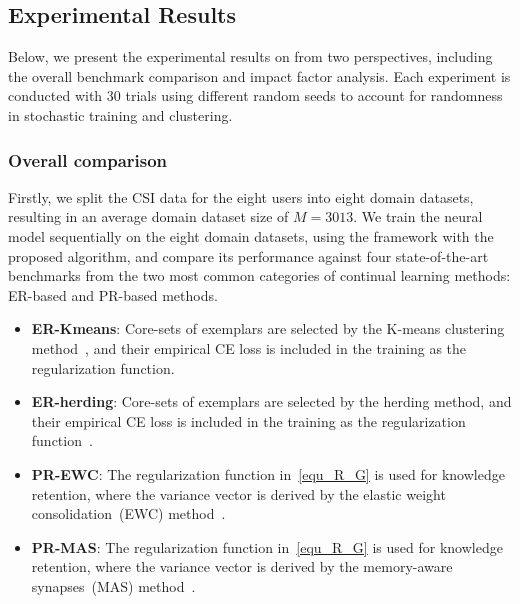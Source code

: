 \subsection{Experimental Results}\label{s2ec_exp_res}
Below, we present the experimental results on \name from two perspectives, including the overall benchmark comparison and impact factor analysis.
Each experiment is conducted with 30 trials using different random seeds to account for randomness in stochastic training and clustering.

\subsubsection{Overall comparison}\label{s3ec_overall_compare}

Firstly, we split the CSI data for the eight users into eight domain datasets, resulting in an average domain dataset size of $M=3013$.
We train the neural model sequentially on the eight domain datasets, using the \name framework with the proposed algorithm, and compare its performance against four state-of-the-art benchmarks from the two most common categories of continual learning methods: ER-based and PR-based methods.
\begin{itemize}[leftmargin=*] 
\item \textbf{ER-Kmeans}: Core-sets of exemplars are selected by the K-means clustering method~\cite{Nguyen18ICLR_VCL}, and their empirical CE loss is included in the training as the regularization function.
\item \textbf{ER-herding}: Core-sets of exemplars are selected by the herding method, and their empirical CE loss is included in the training as the regularization function~\cite{Rebuffi17CVPR_iCaRL}.
\item \textbf{PR-EWC}: The regularization function in~\eqref{equ_R_G} is used for knowledge retention, where the variance vector is derived by the elastic weight consolidation~(EWC) method~\cite{Kirkpatrick17PNAS_Overcome}. 
\item \textbf{PR-MAS}: The regularization function in~\eqref{equ_R_G} is used for knowledge retention, where the variance vector is derived by the memory-aware synapses~(MAS) method~\cite{Aljundi18ECCV_Memory}.
\end{itemize}

